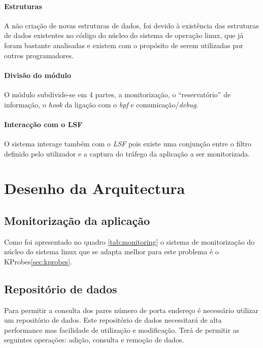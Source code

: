 \paragraph{Estruturas}

A não criação de novas estruturas de dados, foi devido à existência das
estruturas de dados existentes no código do núcleo do sistema de operação
linux, que já foram bastante analisadas e existem com o propósito de serem
utilizadas por outros programadores.

\paragraph{Divisão do módulo} 

O módulo subdivide-se em 4 partes, a monitorização, o ``reservatório'' de
informação, o \textit{hook} da ligação com o \textit{bpf} e
comunicação/\textit{debug}.

\paragraph{Interacção com o LSF}
O sistema interage também com o \textit{LSF} pois existe uma conjunção
entre o filtro definido pelo utilizador e a captura do tráfego da aplicação a
ser monitorizada.

\section{Desenho da Arquitectura}



\subsection{Monitorização da aplicação}

Como foi apresentado no quadro \ref{tab:monitoring} o sistema de monitorização
do núcleo do sistema linux que se adapta melhor para este problema é o
KProbes\ref{sec:kprobes}. 

\subsection{Repositório de dados}

Para permitir a consulta dos pares número de porta endereço é necessário
utilizar um repositório de dados. Este repositório de dados necessitará de alta
performance mas facilidade de utilização e modificação. Terá de permitir as
seguintes operações: adição, consulta e remoção de dados.

